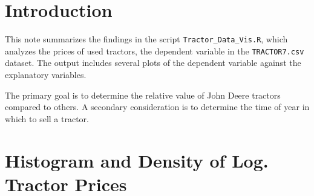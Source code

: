 %
%
%
%
%
%
%
%



\section{Introduction}

This note summarizes the findings in the script
\texttt{Tractor\_Data\_Vis.R},
which analyzes the prices of used tractors,
the dependent variable in the \texttt{TRACTOR7.csv} dataset.
The output includes several plots of the
dependent variable against the explanatory variables.

The primary goal is to determine the relative value of John Deere tractors compared to others.
A secondary consideration is to determine the time of year in which to
sell a tractor.

\vfill
\pagebreak
\section{Histogram and Density of Log. Tractor Prices}


